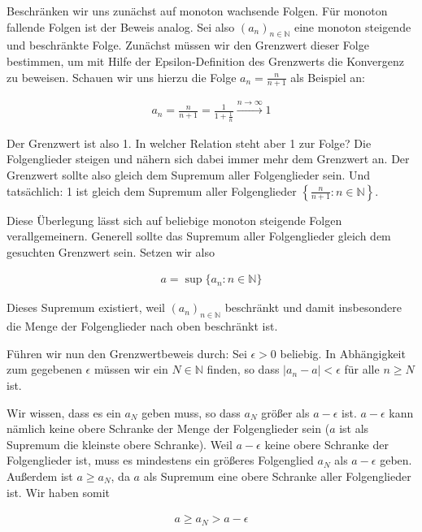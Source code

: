 \documentclass[fontsize=9pt,
               parskip=half-,
               DIV=14,
               listof=chapterentry,
               tocflat]{scrbook}
\begin{document}
\begin{proof*}
Beschränken wir uns zunächst auf monoton wachsende Folgen. Für monoton fallende Folgen ist der Beweis analog. Sei also $(a_{n})_{n\in \mathbb {N} }$ eine monoton steigende und beschränkte Folge. Zunächst müssen wir den Grenzwert dieser Folge bestimmen, um mit Hilfe der Epsilon-Definition des Grenzwerts die Konvergenz zu beweisen. Schauen wir uns hierzu die Folge $a_{n}={\tfrac {n}{n+1}}$ als Beispiel an:

\begin{align*}
a_{n}={\frac {n}{n+1}}={\frac {1}{1+{\frac {1}{n}}}}{\xrightarrow {n\to \infty }}1
\end{align*}

Der Grenzwert ist also 1. In welcher Relation steht aber 1 zur Folge? Die Folgenglieder steigen und nähern sich dabei immer mehr dem Grenzwert an. Der Grenzwert sollte also gleich dem Supremum aller Folgenglieder sein. Und tatsächlich: 1 ist gleich dem Supremum aller Folgenglieder $\left\{{\tfrac {n}{n+1}}:n\in \mathbb {N} \right\}$.

Diese Überlegung lässt sich auf beliebige monoton steigende Folgen verallgemeinern. Generell sollte das Supremum aller Folgenglieder gleich dem gesuchten Grenzwert sein. Setzen wir also

\begin{align*}
a=\sup\{a_{n}:n\in \mathbb {N} \}
\end{align*}

Dieses Supremum existiert, weil $(a_{n})_{n\in \mathbb {N} }$ beschränkt und damit insbesondere die Menge der Folgenglieder nach oben beschränkt ist.

Führen wir nun den Grenzwertbeweis durch: Sei $\epsilon >0$ beliebig. In Abhängigkeit zum gegebenen $\epsilon $ müssen wir ein $N\in \mathbb {N} $ finden, so dass $|a_{n}-a|<\epsilon $ für alle $n\geq N$ ist.

Wir wissen, dass es ein $a_{N}$ geben muss, so dass $a_{N}$ größer als $a-\epsilon $ ist. $a-\epsilon $ kann nämlich keine obere Schranke der Menge der Folgenglieder sein ($a$ ist als Supremum die kleinste obere Schranke). Weil $a-\epsilon $ keine obere Schranke der Folgenglieder ist, muss es mindestens ein größeres Folgenglied $a_{N}$ als $a-\epsilon $ geben. Außerdem ist $a\geq a_{N}$, da $a$ als Supremum eine obere Schranke aller Folgenglieder ist. Wir haben somit

\begin{align*}
a\geq a_{N}>a-\epsilon 
\end{align*}


\end{proof*}
\end{document}
